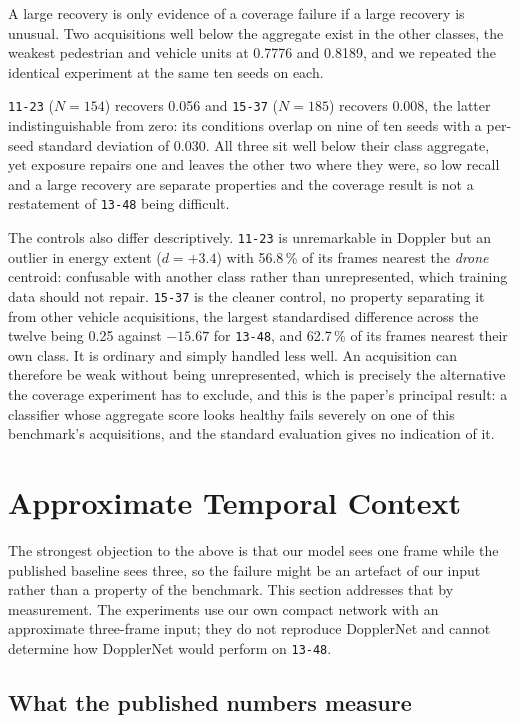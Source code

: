 \documentclass[11pt,a4paper]{article}
\newcommand{\s}[1]{\texttt{#1}}            %
\newcommand{\tgt}{\s{13-48}}               %
\begin{document}
A large recovery is only evidence of a coverage failure if a large recovery is unusual. Two acquisitions well below the aggregate exist in the other classes, the weakest pedestrian and vehicle units at 0.7776 and 0.8189, and we repeated the identical experiment at the same ten seeds on each.

\s{11-23} ($N = 154$) recovers 0.056 and \s{15-37} ($N = 185$) recovers 0.008, the latter indistinguishable from zero: its conditions overlap on nine of ten seeds with a per-seed standard deviation of 0.030. All three sit well below their class aggregate, yet exposure repairs one and leaves the other two where they were, so low recall and a large recovery are separate properties and the coverage result is not a restatement of \tgt{} being difficult.

The controls also differ descriptively. \s{11-23} is unremarkable in Doppler but an outlier in energy extent ($d = +3.4$) with 56.8\,\% of its frames nearest the \emph{drone} centroid: confusable with another class rather than unrepresented, which training data should not repair. \s{15-37} is the cleaner control, no property separating it from other vehicle acquisitions, the largest standardised difference across the twelve being 0.25 against $-15.67$ for \tgt, and 62.7\,\% of its frames nearest their own class. It is ordinary and simply handled less well. An acquisition can therefore be weak without being unrepresented, which is precisely the alternative the coverage experiment has to exclude, and this is the paper's principal result: a classifier whose aggregate score looks healthy fails severely on one of this benchmark's acquisitions, and the standard evaluation gives no indication of it.

\section{Approximate Temporal Context}
\label{sec:temporal}

The strongest objection to the above is that our model sees one frame while the published baseline sees three, so the failure might be an artefact of our input rather than a property of the benchmark. This section addresses that by measurement. The experiments use our own compact network with an approximate three-frame input; they do not reproduce DopplerNet and cannot determine how DopplerNet would perform on \tgt.

\subsection{What the published numbers measure}
\label{sec:published}
\end{document}
